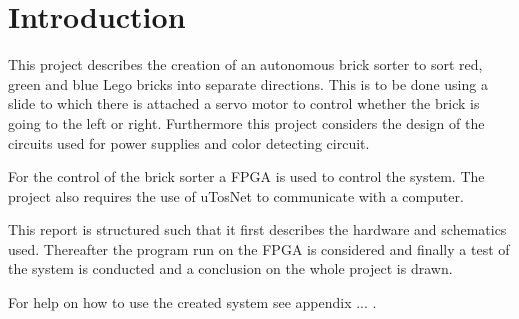 
\section{Introduction}

This project describes the creation of an autonomous brick sorter to sort red, green and blue Lego bricks into separate directions.
This is to be done using a slide to which there is attached a servo motor to control whether the brick is going to the left or right.
Furthermore this project considers the design of the circuits used for power supplies and   color detecting circuit.

For the control of the brick sorter a FPGA is used to control the system.
The project also requires the use of uTosNet to communicate with a computer.

This report is structured such that it first describes the hardware and schematics used.
Thereafter the program run on the FPGA is considered and finally a test of the system is conducted and a conclusion on the whole project is drawn.

For help on how to use the created system see appendix ... .



	